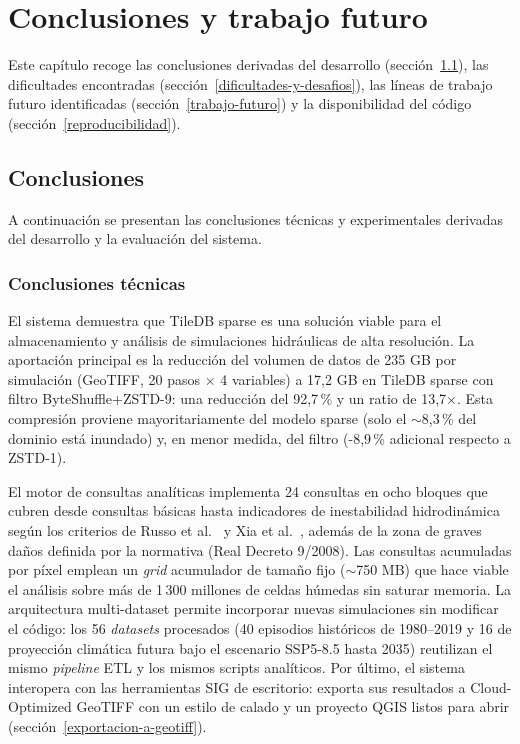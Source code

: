 \chapter{Conclusiones y trabajo futuro}\label{conclusiones-y-trabajo-futuro}

Este capítulo recoge las conclusiones derivadas del desarrollo (sección~\ref{conclusiones}), las dificultades encontradas (sección~\ref{dificultades-y-desafios}), las líneas de trabajo futuro identificadas (sección~\ref{trabajo-futuro}) y la disponibilidad del código (sección~\ref{reproducibilidad}).

\section{Conclusiones}\label{conclusiones}

A continuación se presentan las conclusiones técnicas y experimentales derivadas del desarrollo y la evaluación del sistema.

\subsection{Conclusiones técnicas}\label{conclusiones-tecnicas}

El sistema demuestra que TileDB sparse es una solución viable para el almacenamiento y análisis de simulaciones hidráulicas de alta resolución. La aportación principal es la reducción del volumen de datos de 235 GB por simulación (GeoTIFF, 20 pasos $\times$ 4 variables) a 17,2 GB en TileDB sparse con filtro ByteShuffle+ZSTD-9: una reducción del 92,7\,\% y un ratio de 13,7$\times$. Esta compresión proviene mayoritariamente del modelo sparse (solo el $\sim$8,3\,\% del dominio está inundado) y, en menor medida, del filtro (-8,9\,\% adicional respecto a ZSTD-1).

El motor de consultas analíticas implementa 24 consultas en ocho bloques que cubren desde consultas básicas hasta indicadores de inestabilidad hidrodinámica según los criterios de Russo et al.\ \cite{russo2013} y Xia et al.\ \cite{xia2011vehicles, xia2014}, además de la zona de graves daños definida por la normativa (Real Decreto 9/2008). Las consultas acumuladas por píxel emplean un \textit{grid} acumulador de tamaño fijo ($\sim$750 MB) que hace viable el análisis sobre más de 1\,300 millones de celdas húmedas sin saturar memoria. La arquitectura multi-dataset permite incorporar nuevas simulaciones sin modificar el código: los 56 \textit{datasets} procesados (40 episodios históricos de 1980--2019 y 16 de proyección climática futura bajo el escenario SSP5-8.5 hasta 2035) reutilizan el mismo \textit{pipeline} ETL y los mismos scripts analíticos. Por último, el sistema interopera con las herramientas SIG de escritorio: exporta sus resultados a Cloud-Optimized GeoTIFF con un estilo de calado y un proyecto QGIS listos para abrir (sección~\ref{exportacion-a-geotiff}).

